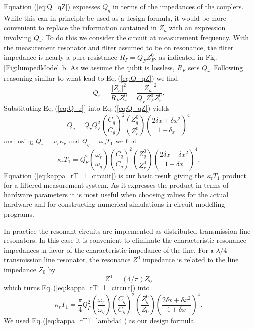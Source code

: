 Equation (\ref{eq:Q_qZ}) expresses $Q_q$ in terms of the impedances of the couplers. While this can in principle be used as a design formula, it would be more convenient to replace the information contained in $Z_{\kappa}$ with an expression involving $Q_r$. To do this we consider the circuit at measurement frequency. With the measurement resonator and filter assumed to be on resonance, the filter impedance is nearly a pure resistance $R_F = Q_F Z_F^0$, as indicated in Fig.\,\ref{Fig:lumpedModel}\,b. As we assume the qubit is lossless, $R_F$ sets $Q_r$. Following reasoning similar to what lead to Eq.\,(\ref{eq:Q_qZ}) we find \begin{equation}
Q_r = \frac{\left| Z_{\kappa} \right|^2}{R_F Z_r^0} = \frac{\left| Z_{\kappa} \right|^2}{Q_F Z_F^0 Z_r^0}. \label{eq:Q_r} \end{equation}
Substituting Eq.\,(\ref{eq:Q_r}) into Eq.\,(\ref{eq:Q_qZ}) yields \begin{equation}
Q_q = Q_r Q_F^2 \left( \frac{C_q}{C_g} \right)^2 \left( \frac{Z_q^0}{Z_r^0} \right) \left( \frac{2\delta x + \delta x^2}{1 + \delta_x} \right)^4 \end{equation}
and using $Q_r = \omega_r \kappa_r$ and $Q_q = \omega_q T_1$ we find \begin{equation}
\kappa_r T_1 = Q_F^2 \left( \frac{\omega_r}{\omega_q} \right) \left( \frac{C_q}{C_g} \right)^2 \left( \frac{Z_q^0}{Z_r^0} \right) \left( \frac{2\delta x + \delta x^2}{1 + \delta x} \right)^4. \label{eq:kappa_rT_1_circuit} \end{equation}
Equation (\ref{eq:kappa_rT_1_circuit}) is our basic result giving the $\kappa_r T_1$ product for a filtered measurement system. As it expresses the product in terms of hardware parameters it is most useful when choosing values for the actual hardware and for constructing numerical simulations in circuit modelling programs.

In practice the resonant circuits are implemented as distributed transmission line resonators. In this case it is convenient to eliminate the characteristic resonance impedances in favor of the characteristic impedance of the line. For a $\lambda/4$ transmission line resonator, the resonance $Z^0$ impedance is related to the line impedance $Z_0$ by \cite{Pozar:microwaveEngineering2009} \begin{equation}
Z^0 = (4/\pi)Z_0 \end{equation}
which turns Eq.\,(\ref{eq:kappa_rT_1_circuit}) into \begin{equation}
\kappa_r T_1 = \frac{\pi}{4} Q_F^2 \left( \frac{\omega_r}{\omega_q} \right) \left( \frac{C_q}{C_g} \right)^2 \left( \frac{Z_q^0}{Z_0} \right) \left( \frac{2\delta x + \delta x^2}{1 + \delta x} \right)^4. \label{eq:kappa_rT1_lambda4} \end{equation}
We used Eq.\,(\ref{eq:kappa_rT1_lambda4}) as our design formula.

